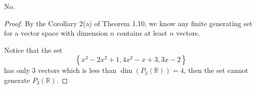 \begin{Exercise}
	\begin{answer}
		No.
	\end{answer}
	\begin{proof}
		By the Corollary 2(a) of Theorem 1.10, we know any finite generating set for a vector space with dimension $n$ contains at least $n$ vectors.
		
		Notice that the set
		$$
		\left\{ x^3-2x^2+1,4x^2-x+3,3x-2 \right\}
		$$
		has only $3$ vectors which is less than $\dim\left(P_3(\mathbb{R})\right) = 4$, then the set cannot generate $P_3(\mathbb{R})$. 
	\end{proof}
\end{Exercise}